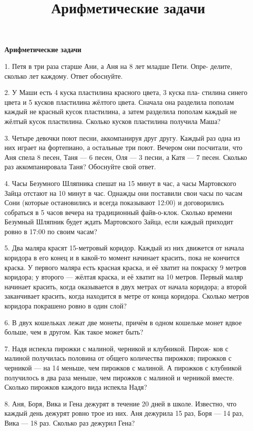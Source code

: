 \centerline{\bf \Huge Арифметические задачи}
\title{Арифметические задачи}


1. Петя в три раза старше Ани, а Аня на 8 лет младше Пети. Опре- делите, сколько лет каждому. Ответ обоснуйте.

2. У Маши есть 4 куска пластилина красного цвета, 3 куска пла- стилина синего цвета и 5 кусков пластилина жёлтого цвета. Сначала она разделила пополам каждый не красный кусок пластилина, а затем разделила пополам каждый не жёлтый кусок пластилина. Сколько кусков пластилина получила Маша?

3. Четыре девочки поют песни, аккомпанируя друг другу. Каждый раз одна из них играет на фортепиано, а остальные три поют. Вечером они посчитали, что Аня спела 8 песен, Таня — 6 песен, Оля — 3 песни, а Катя — 7 песен. Сколько раз аккомпанировала Таня? Обоснуйте свой ответ.

4. Часы Безумного Шляпника спешат на 15 минут в час, а часы Мартовского Зайца отстают на 10 минут в час. Однажды они поставили свои часы по часам Сони (которые остановились и всегда показывают 12:00) и договорились собраться в 5 часов вечера на традиционный файв-о-клок. Сколько времени Безумный Шляпник будет ждать Мартовского Зайца, если каждый приходит ровно в 17:00 по своим часам?

5. Два маляра красят 15-метровый коридор. Каждый из них движется от начала коридора в его конец и в какой-то момент начинает красить, пока не кончится краска. У первого маляра есть красная краска, и её хватит на покраску 9 метров коридора; у второго — жёлтая краска, и её хватит на 10 метров.
Первый маляр начинает красить, когда оказывается в двух метрах от начала коридора; а второй заканчивает красить, когда находится в метре от конца коридора. Сколько метров коридора покрашено ровно в один слой?

6. В двух кошельках лежат две монеты, причём в одном кошельке монет вдвое больше, чем в другом. Как такое может быть?

7. Надя испекла пирожки с малиной, черникой и клубникой. Пирож- ков с малиной получилась половина от общего количества пирожков; пирожков с черникой — на 14 меньше, чем пирожков с малиной. А пирожков с клубникой получилось в два раза меньше, чем пирожков с малиной и черникой вместе. Сколько пирожков каждого вида испекла Надя?

8. Аня, Боря, Вика и Гена дежурят в течение 20 дней в школе. Известно, что каждый день дежурят ровно трое из них. Аня дежурила 15 раз, Боря — 14 раз, Вика — 18 раз. Сколько раз дежурил Гена?

